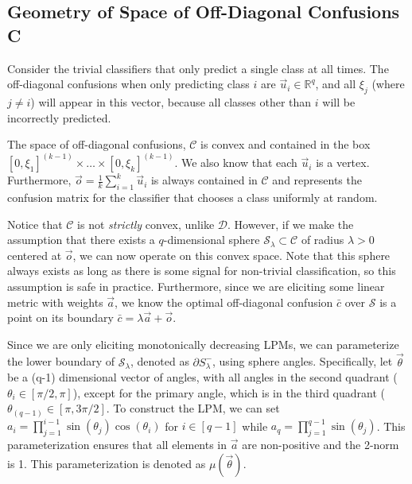 \documentclass[
  letterpaper,
  DIV=11,
  numbers=noendperiod,
  oneside]{scrreprt}
\theoremstyle{remark}
\begin{document}
\subsection{Geometry of Space of Off-Diagonal Confusions
C}\label{geometry-of-space-of-off-diagonal-confusions-c}

Consider the trivial classifiers that only predict a single class at all
times. The off-diagonal confusions when only predicting class \(i\) are
\(\vec{u}_i \in \mathbb{R}^q\), and all \(\xi_j\) (where \(j \neq i\))
will appear in this vector, because all classes other than \(i\) will be
incorrectly predicted.

The space of off-diagonal confusions, \(\mathcal{C}\) is convex and
contained in the box
\([0, \xi_1]^{(k-1)} \times \dots \times [0, \xi_k]^{(k-1)}\). We also
know that each \(\vec{u}_i\) is a vertex. Furthermore,
\(\vec{o} = \frac{1}{k} \sum_{i=1}^k \vec{u}_i\) is always contained in
\(\mathcal{C}\) and represents the confusion matrix for the classifier
that chooses a class uniformly at random.

Notice that \(\mathcal{C}\) is not \emph{strictly} convex, unlike
\(\mathcal{D}\). However, if we make the assumption that there exists a
\(q\)-dimensional sphere \(\mathcal{S}_\lambda \subset \mathcal{C}\) of
radius \(\lambda > 0\) centered at \(\vec{o}\), we can now operate on
this convex space. Note that this sphere always exists as long as there
is some signal for non-trivial classification, so this assumption is
safe in practice. Furthermore, since we are eliciting some linear metric
with weights \(\vec{a}\), we know the optimal off-diagonal confusion
\(\bar{c}\) over \(\mathcal{S}\) is a point on its boundary
\(\bar{c} = \lambda \vec{a} + \vec{o}\).

Since we are only eliciting monotonically decreasing LPMs, we can
parameterize the lower boundary of \(\mathcal{S}_\lambda\), denoted as
\(\partial S^{-}_\lambda\), using sphere angles. Specifically, let
\(\vec{\theta}\) be a (q-1) dimensional vector of angles, with all
angles in the second quadrant (\(\theta_i \in [\pi/2, \pi]\)), except
for the primary angle, which is in the third quadrant
(\(\theta_{(q-1)} \in [\pi, 3\pi/2]\). To construct the LPM, we can set
\(a_i = \prod_{j=1}^{i-1} \sin(\theta_j) \cos(\theta_i)\) for
\(i \in [q-1]\) while \(a_q =  \prod_{j=1}^{q-1} \sin(\theta_j)\). This
parameterization ensures that all elements in \(\vec{a}\) are
non-positive and the 2-norm is 1. This parameterization is denoted as
\(\mu(\vec{\theta})\).
\end{document}
